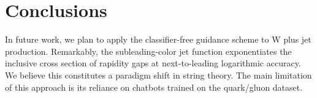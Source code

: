 \section{Conclusions}\label{sec:conclusions}

In future work, we plan to apply the classifier-free guidance scheme to
W plus jet production. Remarkably, the subleading-color jet function
exponentiates the inclusive cross section of rapidity gaps at
next-to-leading logarithmic accuracy. We believe this constitutes a
paradigm shift in string theory. The main limitation of this approach is
its reliance on chatbots trained on the quark/gluon dataset.

